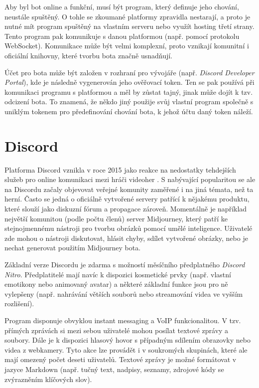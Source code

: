\documentclass[FM]{tulthesis}
\begin{document}
	Aby byl bot online a funkční, musí být program, který definuje jeho chování, neustále spuštěný. O tohle se zkoumané platformy zpravidla nestarají, a proto je nutné mít program spuštěný na vlastním serveru nebo využít hosting třetí strany. Tento program pak komunikuje s danou platformou (např. pomocí protokolu \mbox{WebSocket}). Komunikace může být velmi komplexní, proto vznikají komunitní i oficiální knihovny, které tvorbu bota značně usnadňují.
	
	Účet pro bota může být založen v rozhraní pro vývojáře (např. \textit{Discord Developer Portal}), kde je následně vygenerován jeho ověřovací token. Ten se pak používá při komunikaci programu s platformou a měl by zůstat tajný, jinak může dojít k tzv. odcizení bota. To znamená, že někdo jiný použije svůj vlastní program společně s uniklým tokenem pro předefinování chování bota, k jehož účtu daný token náleží.
	
	\section{Discord}
	
	Platforma Discord vznikla v roce 2015 jako reakce na nedostatky tehdejších služeb pro online komunikaci mezi hráči videoher \cite{lit_Discord}. S nabývající popularitou se ale na Discordu začaly objevovat veřejné komunity zaměřené i na jiná témata, než ta herní. Často se jedná o oficiálně vytvořené servery patřící k nějakému produktu, které slouží jako diskuzní fórum a propagace zároveň. Momentálně je například největší komunitou (podle počtu členů) server Midjourney, který patří ke stejnojmennému nástroji pro tvorbu obrázků pomocí umělé inteligence. Uživatelé zde mohou o nástroji diskutovat, hlásit chyby, sdílet vytvořené obrázky, nebo je nechat generovat použitím Midjourney bota.
	
	Základní verze Discordu je zdarma s možností měsíčního předplatného \textit{Discord Nitro}. Předplatitelé mají navíc k dispozici kosmetické prvky (např. vlastní emotikony nebo animovaný avatar) a některé základní funkce jsou pro ně vylepšeny (např. nahrávání větších souborů nebo streamování videa ve vyšším rozlišení).	

	Program disponuje obvyklou instant messaging a VoIP funkcionalitou. V tzv. přímých zprávách si mezi sebou uživatelé mohou posílat textové zprávy a soubory. Dále je k dispozici hlasový hovor s případným sdílením obrazovky nebo videa z webkamery. Tyto akce lze provádět i v soukromých skupinách, které ale mají omezený počet deseti uživatelů. Textové zprávy je možné formátovat v jazyce Markdown (např. tučný text, nadpisy, seznamy, zdrojové kódy se zvýrazněním klíčových slov).
	
\end{document}
